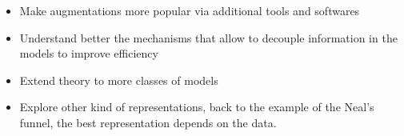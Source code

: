 

\graphicspath{{9_conclusion/figures/}}

\begin{itemize}
    \item Make augmentations more popular via additional tools and softwares
    \item Understand better the mechanisms that allow to decouple information in the models to improve efficiency
    \item Extend theory to more classes of models
    \item Explore other kind of representations, back to the example of the Neal's funnel, the best representation depends on the data.
\end{itemize}


